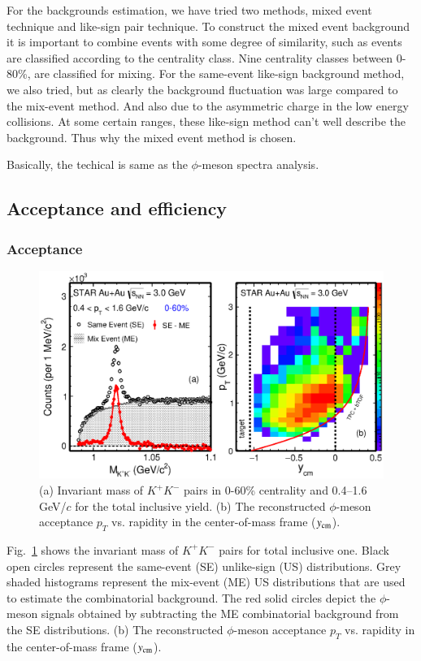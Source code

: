 For the backgrounds estimation, we have tried two methods, mixed event technique and like-sign pair technique. To construct the mixed event background it is important to combine events with some degree of similarity, such as events are classified according to the centrality class. Nine centrality classes between 0-80\%, are classified for mixing. For the same-event like-sign background method, we also tried, but as clearly the background fluctuation was large compared to the mix-event method. And also due to the asymmetric charge in the low energy collisions. At some certain ranges, these like-sign method can't well describe the background. Thus why the mixed event method is chosen.

Basically, the techical is same as the $\phi$-meson spectra analysis. 

\subsection{Acceptance and efficiency}
\subsubsection{Acceptance}

\begin{figure}[h]
\includegraphics[width=0.85\linewidth]{chapterY/fig/fig1_signal.eps}
  \caption{(a) Invariant mass of $K^+K^-$ pairs in 0-60\% centrality and 0.4--1.6\,GeV/$c$ for the total inclusive yield. (b) The reconstructed $\phi$-meson acceptance $p_T$ vs. rapidity in the center-of-mass frame ($y_{\rm cm}$).}
\label{phiSignal}
\end{figure}

Fig.~\ref{phiSignal} shows the invariant mass of $K^+K^-$ pairs for total inclusive one. Black open circles represent the same-event (SE) unlike-sign (US) distributions. Grey shaded histograms represent the mix-event (ME) US distributions that are used to estimate the combinatorial background. The red solid circles depict the $\phi$-meson signals obtained by subtracting the ME combinatorial background from the SE distributions. (b) The reconstructed $\phi$-meson acceptance $p_T$ vs. rapidity in the center-of-mass frame ($y_{\rm cm}$).


